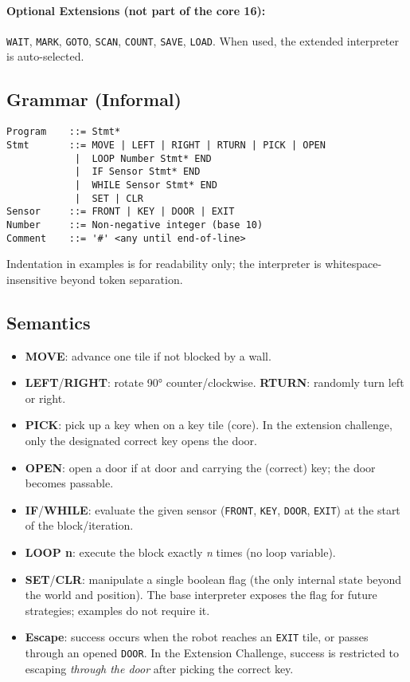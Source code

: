 \documentclass[11pt,a4paper]{article}
\begin{document}
\paragraph{Optional Extensions (not part of the core 16):} \texttt{WAIT}, \texttt{MARK}, \texttt{GOTO}, \texttt{SCAN}, \texttt{COUNT}, \texttt{SAVE}, \texttt{LOAD}. When used, the extended interpreter is auto-selected.

\subsection{Grammar (Informal)}
\begin{verbatim}
Program    ::= Stmt*
Stmt       ::= MOVE | LEFT | RIGHT | RTURN | PICK | OPEN
            |  LOOP Number Stmt* END
            |  IF Sensor Stmt* END
            |  WHILE Sensor Stmt* END
            |  SET | CLR
Sensor     ::= FRONT | KEY | DOOR | EXIT
Number     ::= Non-negative integer (base 10)
Comment    ::= '#' <any until end-of-line>
\end{verbatim}

Indentation in examples is for readability only; the interpreter is whitespace-insensitive beyond token separation.

\subsection{Semantics}
\begin{itemize}[noitemsep]
  \item \textbf{MOVE}: advance one tile if not blocked by a wall.
  \item \textbf{LEFT}/\textbf{RIGHT}: rotate 90° counter/clockwise. \textbf{RTURN}: randomly turn left or right.
  \item \textbf{PICK}: pick up a key when on a key tile (core). In the extension challenge, only the designated correct key opens the door.
  \item \textbf{OPEN}: open a door if at door and carrying the (correct) key; the door becomes passable.
  \item \textbf{IF}/\textbf{WHILE}: evaluate the given sensor (\texttt{FRONT}, \texttt{KEY}, \texttt{DOOR}, \texttt{EXIT}) at the start of the block/iteration.
  \item \textbf{LOOP n}: execute the block exactly \textit{n} times (no loop variable).
  \item \textbf{SET}/\textbf{CLR}: manipulate a single boolean flag (the only internal state beyond the world and position). The base interpreter exposes the flag for future strategies; examples do not require it.
  \item \textbf{Escape}: success occurs when the robot reaches an \texttt{EXIT} tile, or passes through an opened \texttt{DOOR}. In the Extension Challenge, success is restricted to escaping \emph{through the door} after picking the correct key.
\end{itemize}
\end{document}
